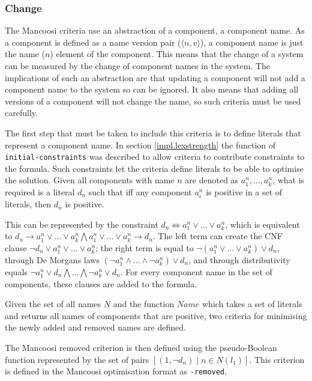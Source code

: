 \subsubsection{Change}
The Mancoosi criteria use an abstraction of a component, a component name. 
As a component is defined as a name version pair ($\langle n,v \rangle$), a component name is just the name ($n$) element of the component. 
This means that the change of a system can be measured by the change of component names in the system.
The implications of such an abstraction are that updating a component will not add a component name to the system so can be ignored.
It also means that adding all versions of a component will not change the name, so such criteria must be used carefully.

The first step that must be taken to include this criteria is to define literals that represent a component name.
In section \ref{impl.lexstrength} the function of \verb+initial-constraints+ was described to allow criteria to contribute constraints to the formula.
Such constraints let the criteria define literals to be able to optimise the solution.
Given all components with name $n$ are denoted as $a^n_1,\ldots,a^n_k$,
what is required is a literal $d_n$ such that iff any component $a^n_i$ is positive in a set of literals, then $d_n$ is positive.

This can be represented by the constraint $d_n \Leftrightarrow a^n_1 \vee \ldots \vee a^n_k$, which
is equivalent to $d_n \rightarrow a^n_1 \vee \ldots \vee a^n_k \bigwedge a^n_1 \vee \ldots \vee a^n_k \rightarrow d_n$.
The left term can create the CNF clause $\neg d_n \vee a^n_1 \vee \ldots \vee a^n_k$;
the right term is equal to $\neg(a^n_1 \vee \ldots \vee a^n_k) \vee d_n$,
through De Morgans laws $(\neg a^n_1 \wedge \ldots \wedge \neg a^n_k) \vee d_n$,
and through distributivity equals $\neg a^n_1 \vee d_n \bigwedge \ldots \bigwedge \neg a^n_k \vee d_n$.      
For every component name in the set of components, these clauses are added to the formula.


Given the set of all names $N$ and the function $Name$ which takes a set of literals and returns all names of components that are positive,
two criteria for minimising the newly added and removed names are defined.
\begin{defs}
The Mancoosi removed criterion is then defined using the pseudo-Boolean function
represented by the set of pairs $[(1,\neg d_n) \mid n \in N(l_1)]$.
This criterion is defined in the Mancoosi optimisation format as \verb+-removed+.
\end{defs}

